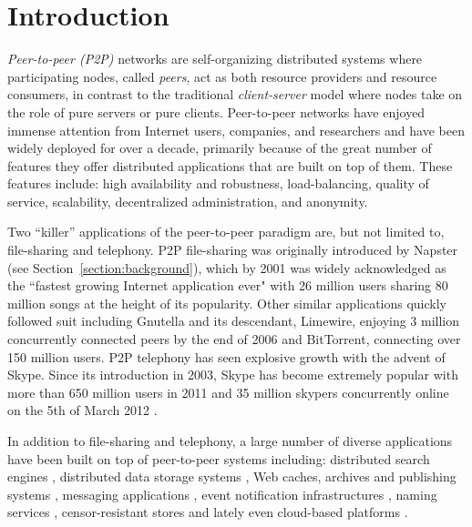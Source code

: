 \section{Introduction}
\label{section:intro}

\emph{Peer-to-peer (P2P)} networks are self-organizing distributed systems where
participating nodes, called \emph{peers}, act as both resource providers and
resource consumers, in contrast to the traditional \emph{client-server} model
where nodes take on the role of pure servers or pure clients. Peer-to-peer
networks have enjoyed immense attention from Internet users, companies, and
researchers and have been widely deployed for over a decade, primarily because
of the great number of features they offer distributed applications that are
built on top of them. These features include:  high availability and robustness,
load-balancing, quality of service, scalability, decentralized administration,
and anonymity. 

Two ``killer'' applications of the peer-to-peer paradigm are, but not limited
to, file-sharing and telephony. P2P file-sharing was originally introduced by
Napster (see Section~\ref{section:background}), which by 2001 was widely
acknowledged as the ``fastest growing Internet application ever" with 26 million
users sharing 80 million songs at the height of its popularity. Other similar
applications quickly followed suit including Gnutella and its descendant,
Limewire, enjoying 3 million concurrently connected peers by the end of 2006
and BitTorrent, connecting over 150 million users. P2P telephony has seen
explosive growth with the advent of Skype. Since its introduction in 2003,
Skype has become extremely popular with more than 650 million users in 2011
\cite{skypetotalusers} and 35 million skypers concurrently online on the 5th of
March 2012 \cite{skypesymusers}.

In addition to file-sharing and telephony, a large number of diverse
applications have been built on top of peer-to-peer systems including:
distributed search engines \cite{yaci}, distributed data storage systems
\cite{kbc_oceanstore_2000,bdet_fsdfs_2000,dkkms_cfs_2001,dr_pastutility_2001,abc_farsite_2002,mmfc_ivy_2002,arla,agebh_dks_2003},
Web caches, archives and publishing systems
\cite{ird_squirrel_2002,bags_youserv_2002,wrc_publius_2000,wm_tangler_2001},
messaging applications \cite{threedegrees}, event notification infrastructures
\cite{rkcd_scribe_2001,cdkr_scribe_2002,agebh_dks_2003}, naming services
\cite{cmm_chorddns_2002}, censor-resistant stores \cite{cswh_freenet_2001} and
lately even cloud-based platforms \cite{mgpj_cloudsnap_2011}.


